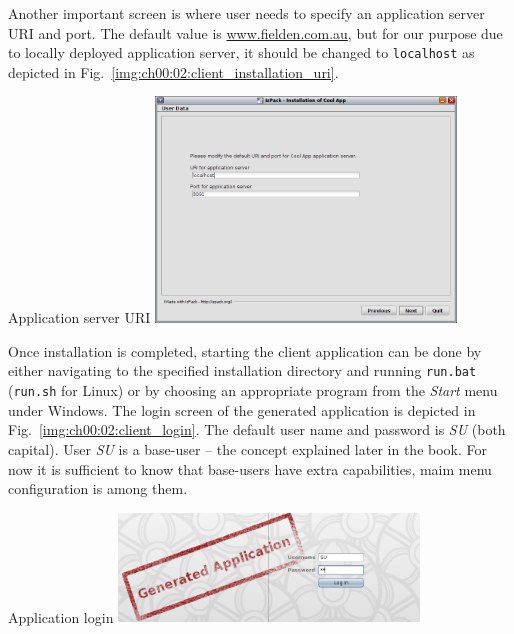   Another important screen is where user needs to specify an application server URI and port.
  The default value is \url{www.fielden.com.au}, but for our purpose due to locally deployed application server, it should be changed to \texttt{localhost} as depicted in Fig.~\ref{img:ch00:02:client_installation_uri}.

  \begin{image}{Application server URI}{\label{img:ch00:02:client_installation_uri}}    
    \includegraphics[width=0.6\textwidth]{parts/00-part/chapters/01-application-modules/images/03-client-installation-uri.png}
  \end{image}
  
  Once installation is completed, starting the client application can be done by either navigating to the specified installation directory and running \texttt{run.bat} (\texttt{run.sh} for Linux) or by choosing an appropriate program from the \emph{Start} menu under Windows.
  The login screen of the generated application is depicted in Fig.~\ref{img:ch00:02:client_login}.
  The default user name and password is \emph{SU} (both capital).
  User \emph{SU} is a base-user -- the concept explained later in the book.
  For now it is sufficient to know that base-users have extra capabilities, maim menu configuration is among them.
  
  \begin{image}{Application login}{\label{img:ch00:02:client_login}}    
    \includegraphics[width=0.6\textwidth]{parts/00-part/chapters/01-application-modules/images/04-client-login.png}
  \end{image}

